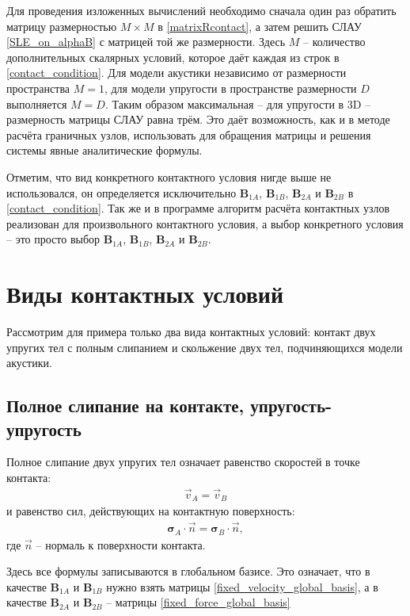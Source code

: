 Для проведения изложенных вычислений необходимо сначала один раз обратить матрицу размерностью $M \times M$ в \eqref{matrixRcontact}, а затем решить СЛАУ \eqref{SLE_on_alphaB} с матрицей той же размерности. Здесь $M$ -- количество дополнительных скалярных условий, которое даёт каждая из строк в \eqref{contact_condition}. Для модели акустики независимо от размерности пространства $M = 1$, для модели упругости в пространстве размерности $D$ выполняется $M = D$. Таким образом максимальная -- для упругости в 3D -- размерность матрицы СЛАУ равна трём. Это даёт возможность, как и в методе расчёта граничных узлов, использовать для обращения матрицы и решения системы явные аналитические формулы.

Отметим, что вид конкретного контактного условия нигде выше не использовался, он определяется исключительно 
$\mathbf{B}_{1A}$, $\mathbf{B}_{1B}$, $\mathbf{B}_{2A}$ и $\mathbf{B}_{2B}$ в \eqref{contact_condition}. Так же и в программе алгоритм расчёта контактных узлов реализован для произвольного контактного условия, а выбор конкретного условия -- это просто выбор $\mathbf{B}_{1A}$, $\mathbf{B}_{1B}$, $\mathbf{B}_{2A}$ и $\mathbf{B}_{2B}$.

\section{Виды контактных условий}
Рассмотрим для примера только два вида контактных условий: контакт двух упругих тел с полным слипанием и скольжение двух тел, подчиняющихся модели акустики.

\subsection{Полное слипание на контакте, упругость-упругость}
Полное слипание двух упругих тел означает равенство скоростей в точке контакта:
\begin{eqnarray}
\vec{v}_A = \vec{v}_B
\end{eqnarray}
и равенство сил, действующих на контактную поверхность:
\begin{eqnarray}
\mathbf{\sigma}_A \cdot \vec{n} = \mathbf{\sigma}_B \cdot \vec{n},
\end{eqnarray}
где $\vec{n}$ -- нормаль к поверхности контакта.

Здесь все формулы записываются в глобальном базисе. Это означает, что в качестве $\mathbf{B}_{1A}$ и $\mathbf{B}_{1B}$ нужно взять матрицы \eqref{fixed_velocity_global_basis}, а в качестве $\mathbf{B}_{2A}$ и $\mathbf{B}_{2B}$ -- матрицы \eqref{fixed_force_global_basis}

